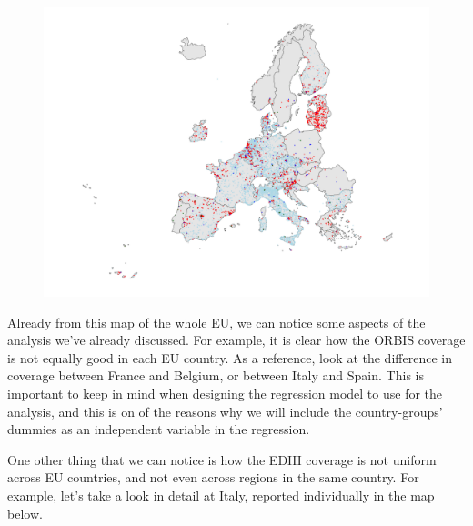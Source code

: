 \documentclass[12pt]{report}
\begin{document}
\begin{figure}[h!]
    \centering
    \includegraphics[width=\linewidth,trim={2.8cm 0cm 2.5cm 0.5cm},clip]{../Output/EU_map.pdf}
    \caption{}
    \label{fig:map_obs_EU}
\end{figure}

\par Already from this map of the whole EU, we can notice some aspects of the analysis we've already discussed. For example, it is clear how the ORBIS coverage is not equally good in each EU country. As a reference, look at the difference in coverage between France and Belgium, or between Italy and Spain. This is important to keep in mind when designing the regression model to use for the analysis, and this is on of the reasons why we will include the country-groups' dummies as an independent variable in the regression.

\par One other thing that we can notice is how the EDIH coverage is not uniform across EU countries, and not even across regions in the same country. For example, let's take a look in detail at Italy, reported individually in the map below.
\end{document}
